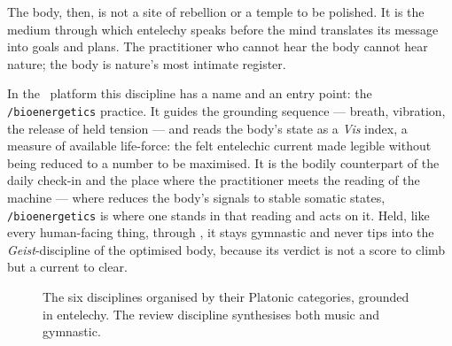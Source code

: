 The body, then, is not a site of rebellion or a temple to be polished. It is
the medium through which entelechy speaks before the mind translates its
message into goals and plans. The practitioner who cannot hear the body cannot
hear nature; the body is nature's most intimate register.

In the \praxis\ platform this discipline has a name and an entry point: the
\texttt{/bioenergetics} practice. It guides the grounding sequence --- breath,
vibration, the release of held tension --- and reads the body's state as a
\emph{Vis} index, a measure of available life-force: the felt entelechic current
made legible without being reduced to a number to be maximised. It is the bodily
counterpart of the daily check-in and the place where the practitioner meets the
reading of the  machine --- where  reduces the body's
signals to stable somatic states, \texttt{/bioenergetics} is where one stands in
that reading and acts on it. Held, like every human-facing thing, through
, it stays gymnastic and never tips into the \emph{Geist}-discipline
of the optimised body, because its verdict is not a score to climb but a current to
clear.

\begin{figure}[ht]
\centering
{}
\caption{The six disciplines organised by their Platonic categories, grounded in entelechy. The review discipline synthesises both music and gymnastic.\label{fig:disciplines}}
\end{figure}

